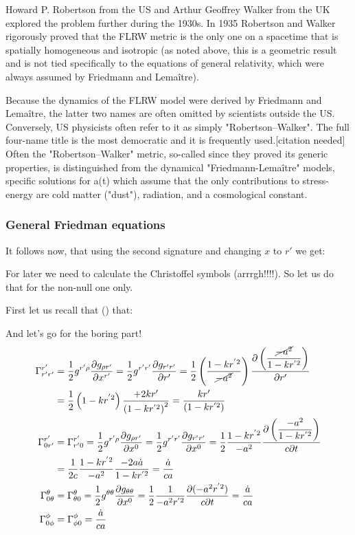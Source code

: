 	Howard P. Robertson from the US and Arthur Geoffrey Walker from the UK explored the problem further during the 1930s. In 1935 Robertson and Walker rigorously proved that the FLRW metric is the only one on a spacetime that is spatially homogeneous and isotropic (as noted above, this is a geometric result and is not tied specifically to the equations of general relativity, which were always assumed by Friedmann and Lemaître).

	Because the dynamics of the FLRW model were derived by Friedmann and Lemaître, the latter two names are often omitted by scientists outside the US. Conversely, US physicists often refer to it as simply "Robertson–Walker". The full four-name title is the most democratic and it is frequently used.[citation needed] Often the "Robertson–Walker" metric, so-called since they proved its generic properties, is distinguished from the dynamical "Friedmann-Lemaître" models, specific solutions for a(t) which assume that the only contributions to stress-energy are cold matter ("dust"), radiation, and a cosmological constant.
	
	\subsubsection{General Friedman equations}
	It follows now, that using the second signature and changing $x$ to $r'$ we get:
	
	For later we need to calculate the Christoffel symbols (arrrgh!!!!). So let us do that for the non-null one only.

	First let us recall that () that:
	
	And let's go for the boring part!
	\begin{gather*}
		\begin{aligned}
		\Gamma^{r'}_{r'r'}&=\frac{1}{2} g^{r'\rho}\frac{\partial g_{\rho r'}}{\partial x^{r'}}=\frac{1}{2} g^{r'r'}\frac{\partial g_{r'r'}}{\partial r^\prime}=\frac{1}{2}\left(\frac{1-k r^{'2}}{\cancel{-a^2}}\right)\frac{\partial\left(\displaystyle\frac{\cancel{-a^2}}{1-k r^{'2}}\right)}{\partial r^\prime}\\
		&=\frac{1}{2}\left(1-k r^{'2}\right)\frac{+2k r'}{\left(1-k r^{'2}\right)^2}=\frac{k r'}{\left(1-k r^{'2}\right)}\\
		\Gamma^{r'}_{0r'}&=\Gamma^{r'}_{r'0}=\frac{1}{2} g^{r'\rho}\frac{\partial g_{\rho r'}}{\partial x^{0}}=\frac{1}{2} g^{r'r'}\frac{\partial g_{r'r'}}{\partial x^0}=\frac{1}{2}\frac{1-k r^{'2}}{-a^2}\frac{\partial\left(\displaystyle\frac{-a^2}{1-k r^{'2}}\right)}{c\partial t}\\
		&=\frac{1}{2c}\frac{1-k r^{'2}}{-a^2}\frac{-2 a \dot{a}}{1-k r^{'2}}=\frac{\dot{a}}{c a}\\
		\Gamma^{\theta}_{0\theta}&=\Gamma^{\theta}_{\theta 0}=\frac{1}{2} g^{\theta\theta}\frac{\partial g_{\theta\theta}}{\partial x^{0}}=\frac{1}{2}\frac{1}{-a^2 r^{'2}}\frac{\partial(-a^2 r^{'2})}{c\partial t}=\frac{\dot{a}}{c a}\\
		\Gamma^\phi_{0\phi}&=\Gamma^\phi_{\phi 0}=\frac{\dot{a}}{c a}
		\end{aligned}
	\end{gather*}
	
